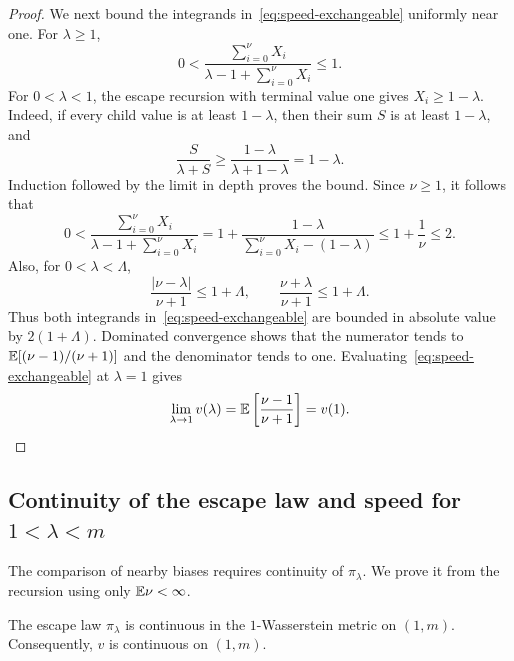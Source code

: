 \begin{proof}
We next bound the integrands in~\eqref{eq:speed-exchangeable} uniformly near one. For $\lambda\ge1$,
\begin{equation*}
 0<\frac{\sum_{i=0}^{\nu}X_i}
        {\lambda-1+\sum_{i=0}^{\nu}X_i}\le1.
\end{equation*}
For $0<\lambda<1$, the escape recursion with terminal value one gives $X_i\ge1-\lambda$. Indeed, if every child value is at least $1-\lambda$, then their sum $S$ is at least $1-\lambda$, and
\begin{equation*}
 \frac{S}{\lambda+S}
 \ge\frac{1-\lambda}{\lambda+1-\lambda}=1-\lambda.
\end{equation*}
Induction followed by the limit in depth proves the bound. Since $\nu\ge1$, it follows that
\begin{equation*}
 0<\frac{\sum_{i=0}^{\nu}X_i}
        {\lambda-1+\sum_{i=0}^{\nu}X_i}
 =1+\frac{1-\lambda}{\sum_{i=0}^{\nu}X_i-(1-\lambda)}
 \le1+\frac1\nu\le2.
\end{equation*}
Also, for $0<\lambda<\Lambda$,
\begin{equation*}
 \frac{|\nu-\lambda|}{\nu+1}\le1+\Lambda,
 \qquad
 \frac{\nu+\lambda}{\nu+1}\le1+\Lambda.
\end{equation*}
Thus both integrands in~\eqref{eq:speed-exchangeable} are bounded in absolute value by $2(1+\Lambda)$. Dominated convergence shows that the numerator tends to $\mathbb E[(\nu-1)/(\nu+1)]$ and the denominator tends to one. Evaluating~\eqref{eq:speed-exchangeable} at $\lambda=1$ gives
\begin{equation*}
 \lim_{\lambda\to1}v(\lambda)
 =\mathbb E\left[\frac{\nu-1}{\nu+1}\right]
 =v(1).\qedhere
\end{equation*}
\end{proof}

\subsection{Continuity of the escape law and speed for \texorpdfstring{$1<\lambda<m$}{1 < lambda < m}}
The comparison of nearby biases requires continuity of $\pi_\lambda$. We prove it from the recursion using only $\mathbb E\nu<\infty$.

\begin{lemma}\label{lem:continuity}
The escape law $\pi_\lambda$ is continuous in the $1$-Wasserstein metric on $(1,m)$. Consequently, $v$ is continuous on $(1,m)$.
\end{lemma}

